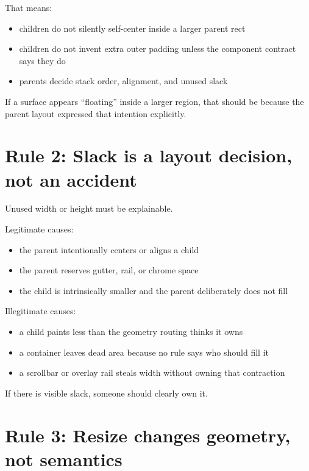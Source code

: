 That means:

\begin{itemize}
\tightlist
\item
  children do not silently self-center inside a larger parent rect
\item
  children do not invent extra outer padding unless the component contract says they do
\item
  parents decide stack order, alignment, and unused slack
\end{itemize}

If a surface appears ``floating'' inside a larger region, that should be because the parent layout expressed that intention explicitly.

\section{Rule 2: Slack is a layout decision, not an accident}\label{record-048-rule-2-slack-is-a-layout-decision-not-an-accident}

Unused width or height must be explainable.

Legitimate causes:

\begin{itemize}
\tightlist
\item
  the parent intentionally centers or aligns a child
\item
  the parent reserves gutter, rail, or chrome space
\item
  the child is intrinsically smaller and the parent deliberately does not fill
\end{itemize}

Illegitimate causes:

\begin{itemize}
\tightlist
\item
  a child paints less than the geometry routing thinks it owns
\item
  a container leaves dead area because no rule says who should fill it
\item
  a scrollbar or overlay rail steals width without owning that contraction
\end{itemize}

If there is visible slack, someone should clearly own it.

\section{Rule 3: Resize changes geometry, not semantics}\label{record-048-rule-3-resize-changes-geometry-not-semantics}

